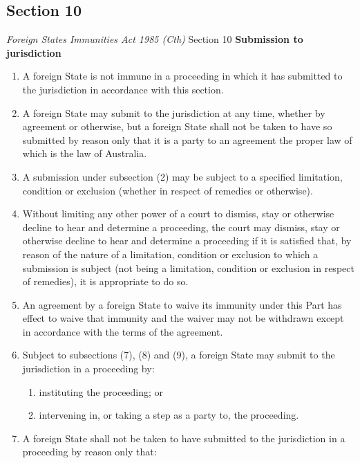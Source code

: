 \subsection{Section 10}
\begin{statutedetails}{\textit{Foreign States Immunities Act 1985 (Cth)} Section 10}
    \flushleft
    \textbf{Submission to jurisdiction}

    \begin{enumerate}[label=(\arabic*)]
        \item A foreign State is not immune in a proceeding in which it has submitted to the jurisdiction in accordance with this section.
        \item A foreign State may submit to the jurisdiction at any time, whether by agreement or otherwise, but a foreign State shall not be taken to have so submitted by reason only that it is a party to an agreement the proper law of which is the law of Australia.
        \item A submission under subsection (2) may be subject to a specified limitation, condition or exclusion (whether in respect of remedies or otherwise).
        \item Without limiting any other power of a court to dismiss, stay or otherwise decline to hear and determine a proceeding, the court may dismiss, stay or otherwise decline to hear and determine a proceeding if it is satisfied that, by reason of the nature of a limitation, condition or exclusion to which a submission is subject (not being a limitation, condition or exclusion in respect of remedies), it is appropriate to do so.
        \item An agreement by a foreign State to waive its immunity under this Part has effect to waive that immunity and the waiver may not be withdrawn except in accordance with the terms of the agreement.
        \item Subject to subsections (7), (8) and (9), a foreign State may submit to the jurisdiction in a proceeding by:
        \begin{enumerate}[label=(\alph*)]
            \item instituting the proceeding; or
            \item intervening in, or taking a step as a party to, the proceeding.           
        \end{enumerate}
        \item A foreign State shall not be taken to have submitted to the jurisdiction in a proceeding by reason only that:
        \begin{enumerate}[label=(\alph*)]

\end{enumerate}
\end{enumerate}
\end{statutedetails}
